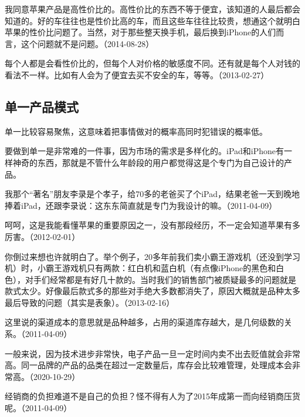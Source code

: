 我同意苹果产品是高性价比的。高性价比的东西不等于便宜，该知道的人最后都会知道的。好的车往往也是性价比高的车，而且这些车往往比较贵，想通这个就明白苹果的性价比问题了。当然，对于那些整天换手机，最后换到iPhone的人们而言，这个问题就不是问题。（2014-08-28）

每个人都是会看性价比的，但每个人对价格的敏感度不同。还有就是每个人对钱的看法不一样。比如有人会为了便宜去买不安全的车，等等。（2013-02-27）

\subsection{单一产品模式}

单一比较容易聚焦，这意味着把事情做对的概率高同时犯错误的概率低。

要做到单一是非常难的一件事，因为市场的需求是多样化的。iPad和iPhone有一样神奇的东西，那就是不管什么年龄段的用户都觉得这是个专门为自己设计的产品。

我那个“著名”朋友李录是个孝子，给70多的老爸买了个iPad，结果老爸一天到晚地捧着iPad，还跟李录说：这东东简直就是专门为我设计的嘛。（2011-04-09）


呵呵，这是我能看懂苹果的重要原因之一，没有那段经历，不一定会知道苹果有多厉害。（2012-02-01）


你倒过来想也许就明白了。举个例子，20多年前我们卖小霸王游戏机（还没到学习机）时，小霸王游戏机只有两款：红白机和蓝白机（有点像iPhone的黑色和白色），对手们经常都是有好几十款的。当时我们的销售部门被质疑最多的问题就是款式太少。好像最后款式多的那些对手绝大多数都消失了，原因大概就是品种太多最后导致的问题（其实是表象）。（2013-02-16）

这里说的渠道成本的意思就是品种越多，占用的渠道库存越大，是几何级数的关系。（2011-04-09）

一般来说，因为技术进步非常快，电子产品一旦一定时间内卖不出去贬值就会非常高。同一品牌的产品的品类在超过一定数量后，库存会比较难管理，处理成本会非常高。（2020-10-29）


经销商的负担难道不是自己的负担？怪不得有人为了2015年成第一而向经销商压货呢。（2011-04-09）


